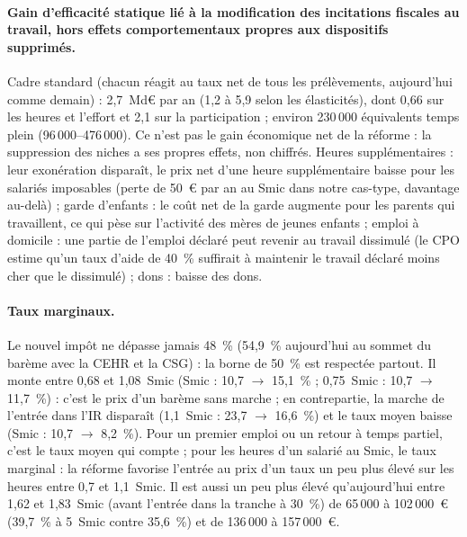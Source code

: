 \paragraph{Gain d'efficacité statique lié à la modification des incitations fiscales au travail, hors effets comportementaux propres aux dispositifs supprimés.} Cadre standard (chacun réagit au taux net de tous les prélèvements, aujourd'hui comme demain) : 2,7~Md€ par an (1,2 à 5,9 selon les élasticités), dont 0,66 sur les heures et l'effort et 2,1 sur la participation ; environ 230\,000 équivalents temps plein (96\,000--476\,000). Ce n'est pas le gain économique net de la réforme : la suppression des niches a ses propres effets, non chiffrés. Heures supplémentaires : leur exonération disparaît, le prix net d'une heure supplémentaire baisse pour les salariés imposables (perte de 50~€ par an au Smic dans notre cas-type, davantage au-delà) ; garde d'enfants : le coût net de la garde augmente pour les parents qui travaillent, ce qui pèse sur l'activité des mères de jeunes enfants ; emploi à domicile : une partie de l'emploi déclaré peut revenir au travail dissimulé (le CPO estime qu'un taux d'aide de 40~\% suffirait à maintenir le travail déclaré moins cher que le dissimulé) ; dons : baisse des dons.

\paragraph{Taux marginaux.} Le nouvel impôt ne dépasse jamais 48~\% (54,9~\% aujourd'hui au sommet du barème avec la CEHR et la CSG) : la borne de 50~\% est respectée partout. Il monte entre 0,68 et 1,08~Smic (Smic : 10,7 $\to$ 15,1~\% ; 0,75~Smic : 10,7 $\to$ 11,7~\%) : c'est le prix d'un barème sans marche ; en contrepartie, la marche de l'entrée dans l'IR disparaît (1,1~Smic : 23,7 $\to$ 16,6~\%) et le taux moyen baisse (Smic : 10,7 $\to$ 8,2~\%). Pour un premier emploi ou un retour à temps partiel, c'est le taux moyen qui compte ; pour les heures d'un salarié au Smic, le taux marginal : la réforme favorise l'entrée au prix d'un taux un peu plus élevé sur les heures entre 0,7 et 1,1~Smic. Il est aussi un peu plus élevé qu'aujourd'hui entre 1,62 et 1,83~Smic (avant l'entrée dans la tranche à 30~\%) de 65\,000 à 102\,000~€ (39,7~\% à 5~Smic contre 35,6~\%) et de 136\,000 à 157\,000~€.


